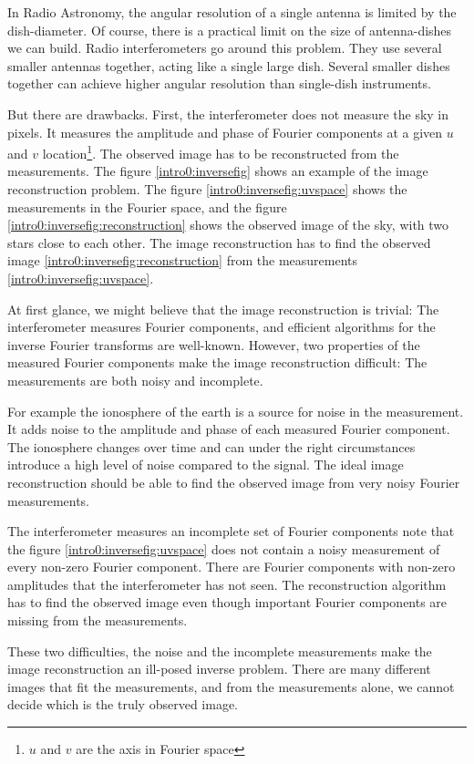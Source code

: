 In Radio Astronomy, the angular resolution of a single antenna is limited by the dish-diameter. Of course, there is a practical limit on the size of antenna-dishes we can build. Radio interferometers go around this problem. They use several smaller antennas together, acting like a single large dish. Several smaller dishes together can achieve higher angular resolution than single-dish instruments.

But there are drawbacks. First, the interferometer does not measure the sky in pixels. It measures the amplitude and phase of Fourier components at a given $u$ and $v$ location\footnote{$u$ and $v$ are the axis in Fourier space}. The observed image has to be reconstructed from the measurements. The figure \ref{intro0:inversefig} shows an example of the image reconstruction problem. The figure \ref{intro0:inversefig:uvspace} shows the measurements in the Fourier space, and the figure \ref{intro0:inversefig:reconstruction} shows the observed image of the sky, with two stars close to each other. The image reconstruction has to find the observed image \ref{intro0:inversefig:reconstruction} from the measurements \ref{intro0:inversefig:uvspace}. 

At first glance, we might believe that the image reconstruction is trivial: The interferometer measures Fourier components, and efficient algorithms for the inverse Fourier transforms are well-known. However, two properties of the measured Fourier components make the image reconstruction difficult: The measurements are both noisy and incomplete.

For example the ionosphere of the earth is a source for noise in the measurement. It adds noise to the amplitude and phase of each measured Fourier component. The ionosphere changes over time and can under the right circumstances introduce a high level of noise compared to the signal. The ideal image reconstruction should be able to find the observed image from very noisy Fourier measurements.

The interferometer measures an incomplete set of Fourier components note that the figure \ref{intro0:inversefig:uvspace} does not contain a noisy measurement of every non-zero Fourier component. There are Fourier components with non-zero amplitudes that the interferometer has not seen. The reconstruction algorithm has to find the observed image even though important Fourier components are missing from the measurements.

These two difficulties, the noise and the incomplete measurements make the image reconstruction an ill-posed inverse problem. There are many different images that fit the measurements, and from the measurements alone, we cannot decide which is the truly observed image. 

